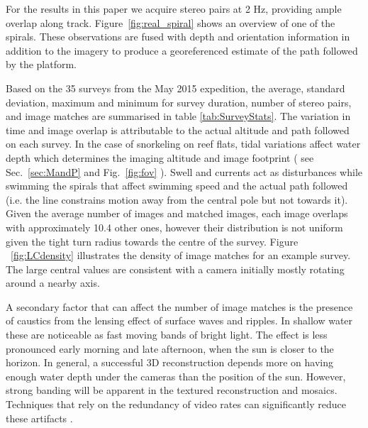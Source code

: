 For the results in this paper we acquire stereo pairs at 2 Hz, providing ample overlap along track. Figure~\ref{fig:real_spiral} shows an overview of one of the spirals. %
These observations are fused with depth and orientation information in addition to the imagery to produce a georeferenced estimate of the path followed by the platform.

Based on the 35 surveys from the May 2015 expedition, the average, standard deviation, maximum and minimum for survey duration, number of stereo pairs, and image matches are summarised in table \ref{tab:SurveyStats}. The variation in time and image overlap is attributable to the actual altitude and path followed on each survey. In the case of snorkeling on reef flats, tidal variations affect water depth which determines the imaging altitude and image footprint ( see Sec.~\ref{sec:MandP} and Fig.~\ref{fig:fov} ). Swell and currents act as disturbances while swimming the spirals that affect swimming speed and the actual path followed (i.e. the line constrains motion away from the central pole but not towards it). Given the average number of images and matched images, each image overlaps with approximately 10.4 other ones, however their distribution is not uniform given the tight turn radius towards the centre of the survey. Figure ~\ref{fig:LCdensity} illustrates the density of image matches for an example survey. The large central values are consistent with a camera initially mostly rotating around a nearby axis. 

A secondary factor that can affect the number of image matches is the presence of caustics from the lensing effect of surface waves and ripples. In shallow water these are noticeable as fast moving bands of bright light. The effect is less pronounced early morning and late afternoon, when the sun is closer to the horizon. In general, a successful 3D reconstruction depends more on having enough water depth under the cameras than the position of the sun. However, strong banding will be apparent in the textured reconstruction and mosaics. Techniques that rely on the redundancy of video rates can significantly reduce these artifacts \cite{Gracias_2008}.



